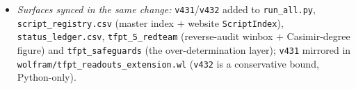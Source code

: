 \documentclass[11pt]{article}
\providecommand{\mE}{\textbf{[E]}}\providecommand{\mC}{\textbf{[C]}}
\providecommand{\vref}[1]{\texttt{#1}}
\begin{document}
\begin{itemize}
downstream witness) gives a floor $\le10^{-6}$ across a grid of generous assignments, nominal
$\sim10^{-10}$. \mE\ that floor sits $\sim20$ orders \emph{above} the \vref{v100} conditional $10^{-30.7}$;
the gap is exactly the evidential value of proving the forms forced, so the $\alpha$ form-derivation
(\texttt{ALPHA.QUILLEN.EXACT.01}, \vref{v382}) and this floor are the \emph{same} lever. \mC\ \textbf{honest
scope:} bounds only the ``is it numerology?'' question, not the physics bridge (firewall \vref{v187}); a
conservative floor, not a posterior.
\item \emph{Surfaces synced in the same change:} \vref{v431}/\vref{v432} added to \texttt{run\_all.py},
\texttt{script\_registry.csv} (master index $+$ website \texttt{ScriptIndex}), \texttt{status\_ledger.csv},
\texttt{tfpt\_5\_redteam} (reverse-audit winbox $+$ Casimir-degree figure) and \texttt{tfpt\_safeguards}
(the over-determination layer); \texttt{v431} mirrored in
\texttt{wolfram/tfpt\_readouts\_extension.wl} (\texttt{v432} is a conservative bound, Python-only).
\end{itemize}
\end{document}

